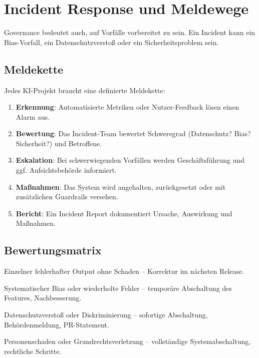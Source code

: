 \section{Incident Response und Meldewege}

Governance bedeutet auch, auf Vorfälle vorbereitet zu sein. Ein Incident kann ein Bias-Vorfall, ein Datenschutzverstoß oder ein Sicherheitsproblem sein.

\subsection{Meldekette}

Jedes KI-Projekt braucht eine definierte Meldekette:

\begin{enumerate}[leftmargin=*]
    \item \textbf{Erkennung}: Automatisierte Metriken oder Nutzer-Feedback lösen einen Alarm aus.
    \item \textbf{Bewertung}: Das Incident-Team bewertet Schweregrad (Datenschutz? Bias? Sicherheit?) und Betroffene.
    \item \textbf{Eskalation}: Bei schwerwiegenden Vorfällen werden Geschäftsführung und ggf. Aufsichtsbehörde informiert.
    \item \textbf{Maßnahmen}: Das System wird angehalten, zurückgesetzt oder mit zusätzlichen Guardrails versehen.
    \item \textbf{Bericht}: Ein Incident Report dokumentiert Ursache, Auswirkung und Maßnahmen.
\end{enumerate}

\subsection{Bewertungsmatrix}

\begin{description}[leftmargin=*,style=nextline]
    \item[Gering] Einzelner fehlerhafter Output ohne Schaden -- Korrektur im nächsten Release.
    \item[Mittel] Systematischer Bias oder wiederholte Fehler -- temporäre Abschaltung des Features, Nachbesserung.
    \item[Hoch] Datenschutzverstoß oder Diskriminierung -- sofortige Abschaltung, Behördenmeldung, PR-Statement.
    \item[Kritisch] Personenschaden oder Grundrechtsverletzung -- vollständige Systemabschaltung, rechtliche Schritte.
\end{description}

